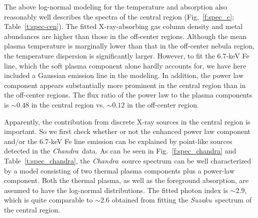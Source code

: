 \documentclass[usenatbib]{mnras}
\def\suzaku{{\sl Suzaku}}
\def\chandra{{\sl Chandra}}
\begin{document}
The above log-normal modeling for the temperature and absorption also reasonably well describes the spectra of the central region (Fig,~\ref{f:spec_c}; Table~\ref{t:spec-cen}). The fitted X-ray-absorbing gas column density and metal abundances are higher than those in the off-center regions. Although the mean plasma temperature is marginally lower than that in the off-center nebula region, the temperature dispersion is significantly larger. However, to fit the 6.7-keV Fe line, which the soft plasma component alone hardly accounts for, we have here included a Gaussian emission line in the modeling. In addition, the power law component appears substantially more prominent in the central region than in the off-center regions. The flux ratio of the power law to the plasma components is $\sim 0.48$ in the central region vs. $\sim 0.12$ in the off-center region. 

Apparently, the contribution from discrete X-ray sources in the central region is important. So we first check whether or not the enhanced power law component and/or the 6.7-keV Fe line emission can be explained by point-like sources detected in the \chandra\ data.  As can be seen in Fig.~\ref{f:spec_chandra} and Table~\ref{t:spec_chandra}, the \chandra\ source spectrum can be well characterized by a model consisting of two thermal plasma components plus a power-law component. Both the thermal plasma, as well as the foreground absorption, are assumed to have the log-normal distributions. The fitted photon index is $\sim 2.9$, which is quite comparable to $\sim 2.6$ obtained from fitting the \suzaku\ spectrum of the central region. 
\end{document}
